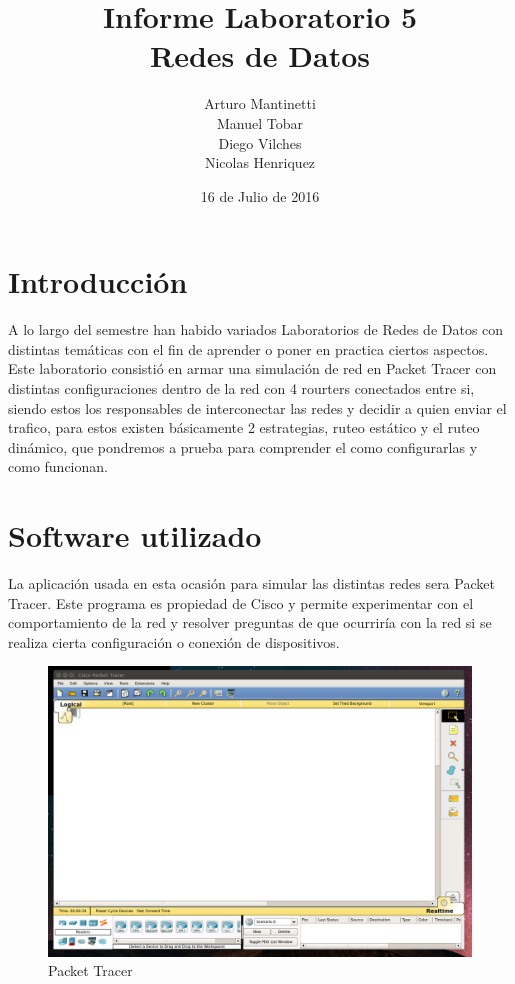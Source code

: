 \documentclass[spanish]{udpreport}
\title{Informe Laboratorio 5 \\ Redes de Datos}
\author{Arturo Mantinetti \\ Manuel Tobar \\ Diego Vilches \\ Nicolas Henriquez}
\date{16 de Julio de 2016}
\begin{document}
\maketitle

\tableofcontents

\chapter{Introducción}

A lo largo del semestre han habido variados Laboratorios de Redes de Datos con distintas temáticas con el fin de aprender o poner en practica ciertos aspectos.
Este laboratorio consistió en armar una simulación de red en Packet Tracer con distintas configuraciones dentro de la red con 4 rourters conectados entre si, siendo estos los responsables de interconectar las redes y decidir a quien enviar el trafico, para estos existen básicamente 2 estrategias, ruteo estático y el ruteo dinámico, que pondremos a prueba para comprender el como configurarlas y como funcionan.

\chapter{Software utilizado}
La aplicación usada en esta ocasión para simular las distintas redes sera Packet Tracer. Este programa es propiedad de Cisco y permite experimentar con el comportamiento de la red y resolver preguntas de que ocurriría con la red si se realiza cierta configuración o conexión de dispositivos.

\begin{figure}[H]
	\centering
	\includegraphics[scale=.25]{imagenes/A0e.png}
	\caption{Packet Tracer}
	\label{fig:Figura 1.1}
\end{figure}
\end{document}
